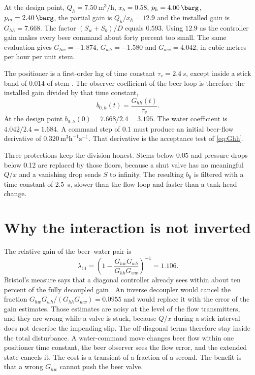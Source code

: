 \documentclass[conference,a4paper]{IEEEtran}
\begin{document}
At the design point, $Q_h=\SI{7.50}{\cubic\metre\per\hour}$, $x_h=0.58$, $p_h=\SI{4.00}{\barg}$, $p_m=\SI{2.40}{\barg}$, the partial gain is $Q_h/x_h=12.9$ and the installed gain is $G_{hh}=7.668$. The factor $(S_w+S_b)/D$ equals $0.593$. Using $12.9$ as the controller gain makes every beer command about forty percent too small. The same evaluation gives $G_{hw}=-1.874$, $G_{wh}=-1.580$ and $G_{ww}=4.042$, in cubic metres per hour per unit stem.

The positioner is a first-order lag of time constant $\tau_v=\SI{2.4}{s}$, except inside a stick band of $0.014$ of stem \cite{choudhury2005modelling}. The observer coefficient of the beer loop is therefore the installed gain divided by that time constant,
\begin{equation}
\label{eq:b0}
b_{0,h}(t)=\frac{G_{hh}(t)}{\tau_v}.
\end{equation}
At the design point $b_{0,h}(0)=7.668/2.4=3.195$. The water coefficient is $4.042/2.4=1.684$. A command step of $0.1$ must produce an initial beer-flow derivative of $0.320\,\mathrm{m}^3\mathrm{h}^{-1}\mathrm{s}^{-1}$. That derivative is the acceptance test of \eqref{eq:Ghh}.

Three protections keep the division honest. Stems below $0.05$ and pressure drops below \SI{0.12}{\barg} are replaced by those floors, because a shut valve has no meaningful $Q/x$ and a vanishing drop sends $S$ to infinity. The resulting $b_0$ is filtered with a time constant of \SI{2.5}{s}, slower than the flow loop and faster than a tank-head change.

\section{Why the interaction is not inverted}
The relative gain of the beer--water pair is
\begin{equation}
\lambda_{11}=\left(1-\frac{G_{hw}G_{wh}}{G_{hh}G_{ww}}\right)^{-1}=1.106.
\end{equation}
Bristol's measure says that a diagonal controller already sees within about ten percent of the fully decoupled gain \cite{bristol1966rga,skogestad2005multivariable}. An inverse decoupler would cancel the fraction $G_{hw}G_{wh}/(G_{hh}G_{ww})=0.0955$ and would replace it with the error of the gain estimates. Those estimates are noisy at the level of the flow transmitters, and they are wrong while a valve is stuck, because $Q/x$ during a stick interval does not describe the impending slip. The off-diagonal terms therefore stay inside the total disturbance. A water-command move changes beer flow within one positioner time constant, the beer observer sees the flow error, and the extended state cancels it. The cost is a transient of a fraction of a second. The benefit is that a wrong $G_{hw}$ cannot push the beer valve.
\end{document}
